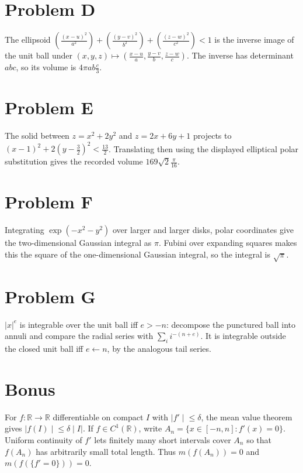 \section{Problem D}

The ellipsoid \(\left( \frac{\left( {x - u} \right)^{2}}{a^{2}} \right) + \left( \frac{\left( {y - v} \right)^{2}}{b^{2}} \right) + \left( \frac{\left( {z - w} \right)^{2}}{c^{2}} \right) < 1\) is the inverse image of the unit ball under \(\left( {x,y,z} \right)\mapsto\left( {\frac{x - u}{a},\frac{y - v}{b},\frac{z - w}{c}} \right)\). The inverse has determinant \(abc\), so its volume is \(4\pi ab\frac{c}{3}\).

\section{Problem E}

The solid between \(z = x^{2} + 2y^{2}\) and \(z = 2x + 6y + 1\) projects to \(\left( {x - 1} \right)^{2} + 2\left( {y - \frac{3}{2}} \right)^{2} < \frac{13}{2}\). Translating then using the displayed elliptical polar substitution gives the recorded volume \(169\sqrt{2}\frac{\pi}{16}\).

\section{Problem F}

Integrating \(\exp\left( {- x^{2} - y^{2}} \right)\) over larger and larger disks, polar coordinates give the two-dimensional Gaussian integral as \(\pi\). Fubini over expanding squares makes this the square of the one-dimensional Gaussian integral, so the integral is \(\sqrt{\pi}\).

\section{Problem G}

\(|x|^{e}\) is integrable over the unit ball iff \(e > - n\): decompose the punctured ball into annuli and compare the radial series with \(\sum_{i}i^{- {({n + e})}}\). It is integrable outside the closed unit ball iff \(e\leftarrow n\), by the analogous tail series.

\section{Bonus}

For \(f:\mathbb{R}\rightarrow\mathbb{R}\) differentiable on compact \(I\) with \(\left. |f' \middle| \leq \delta \right.\), the mean value theorem gives \(\left. |f(I) \middle| \leq \delta \middle| I| \right.\). If \(f \in C^{1}\left( \mathbb{R} \right)\), write \(A_{n} = \{ x \in \left\lbrack {- n,n} \right\rbrack:f'(x) = 0\}\). Uniform continuity of \(f'\) lets finitely many short intervals cover \(A_{n}\) so that \(f\left( A_{n} \right)\) has arbitrarily small total length. Thus \(m\left( {f\left( A_{n} \right)} \right) = 0\) and \(m\left( {f\left( {\{ f' = 0\}} \right)} \right) = 0\).
